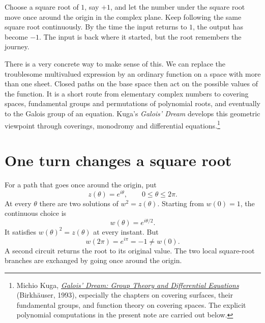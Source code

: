 
Choose a square root of \(1\), say \(+1\), and let the number under the square root move once around the origin in the complex plane. Keep following the same square root continuously. By the time the input returns to \(1\), the output has become \(-1\). The input is back where it started, but the root remembers the journey.

There is a very concrete way to make sense of this. We can replace the troublesome multivalued expression by an ordinary function on a space with more than one sheet. Closed paths on the base space then act on the possible values of the function. It is a short route from elementary complex numbers to covering spaces, fundamental groups and permutations of polynomial roots, and eventually to the Galois group of an equation. Kuga's \emph{Galois' Dream} develops this geometric viewpoint through coverings, monodromy and differential equations.\footnote{Michio Kuga, \href{https://link.springer.com/book/10.1007/978-1-4612-0329-2}{\emph{Galois' Dream: Group Theory and Differential Equations}} (Birkh\"auser, 1993), especially the chapters on covering surfaces, their fundamental groups, and function theory on covering spaces. The explicit polynomial computations in the present note are carried out below.}

\section{One turn changes a square root}

For a path that goes once around the origin, put
\[
 z(\theta)=e^{i\theta},\qquad0\leq\theta\leq2\pi.
\]
At every \(\theta\) there are two solutions of \(w^2=z(\theta)\). Starting from \(w(0)=1\), the continuous choice is
\begin{equation}
 w(\theta)=e^{i\theta/2}.
 \label{eq:N20261030-sqrtlift}
\end{equation}
It satisfies \(w(\theta)^2=z(\theta)\) at every instant. But
\[
 w(2\pi)=e^{i\pi}=-1\ne w(0).
\]
A second circuit returns the root to its original value. The two local square-root branches are exchanged by going once around the origin.

